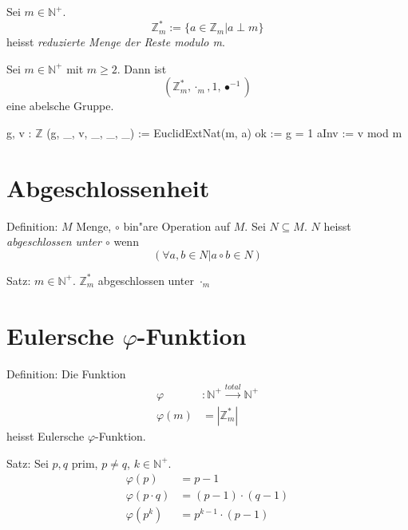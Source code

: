 \documentclass[a4paper, ngerman, landscape, fleqn]{article}
\begin{document}
\begin{multicols*}{3}
Sei $m \in \mathbb{N}^+$.
\begin{equation*}
    \mathbb{Z}^*_m := \{ a \in \mathbb{Z}_m | a \perp m \}
\end{equation*}
heisst \emph{reduzierte Menge der Reste modulo m}.

Sei $m \in \mathbb{N}^+$ mit $m \geq 2$. Dann ist
\begin{equation*}
    (\mathbb{Z}^*_m, \cdot_m, 1, \bullet^{-1}) 
\end{equation*}
eine abelsche Gruppe.

\begin{algorithmic}
        \State {}
        \State {}
        \State {}
        \State g, v : $\mathbb{Z}$
        \State (g, \_, v, \_, \_, \_) := EuclidExtNat(m, a)
        \State {}
        \State ok := g = 1
        \State {}
            \State aInv := v mod m
        \EndIf
    \EndFunction
\end{algorithmic}

\section*{Abgeschlossenheit}
Definition: $M$ Menge, $\circ$ bin"are Operation auf $M$. Sei $N \subseteq M$.
$N$ heisst \emph{abgeschlossen unter $\circ$} wenn
\begin{equation*}
    (\forall a, b \in N | a \circ b \in N)
\end{equation*}

Satz: $m \in \mathbb{N}^+$. $\mathbb{Z}^*_m$ abgeschlossen unter $\cdot_m$

\section*{Eulersche $\varphi$-Funktion}
Definition:  Die Funktion
\begin{align*}
    \varphi &: \mathbb{N}^+ \xrightarrow{total} \mathbb{N}^+ \\
    \varphi(m) &= | \mathbb{Z}^*_m|
\end{align*}
heisst Eulersche $\varphi$-Funktion.

Satz: Sei $p, q$ prim, $p \neq q$, $k \in \mathbb{N}^+$.
\begin{align*}
    \varphi(p) &= p - 1 \\
    \varphi(p \cdot q) &= (p - 1) \cdot (q - 1) \\
    \varphi(p^k) &= p^{k - 1} \cdot (p - 1)
\end{align*}


\end{multicols*}
\end{document}
